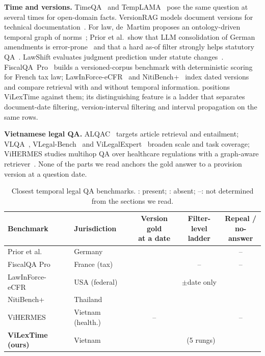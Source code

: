 \documentclass[sigconf,anonymous,review]{acmart}
\newcommand{\cmark}{\textcolor{cGreen}{\ding{51}}}
\newcommand{\xmark}{\textcolor{cVerm}{\ding{55}}}
\begin{document}
\textbf{Time and versions.} TimeQA~\cite{chen2021timeqa} and TempLAMA~\cite{dhingra2022templama} pose the same question at several times for open-domain facts. VersionRAG models document versions for technical documentation~\cite{huwiler2025versionrag}. For law, de~Martim proposes an ontology-driven temporal graph of norms~\cite{demartim2025satgraph}; Prior et al.\ show that LLM consolidation of German amendments is error-prone~\cite{prior2025consolidation} and that a hard as-of filter strongly helps statutory QA~\cite{prior2026oldfriend}. LawShift evaluates judgment prediction under statute changes~\cite{han2025lawshift}. FiscalQA~Pro~\cite{cymbler2026fiscalqa} builds a versioned-corpus benchmark with deterministic scoring for French tax law; LawInForce-eCFR~\cite{yao2026lawinforce} and NitiBench+~\cite{akarajaradwong2026nitibenchplus} index dated versions and compare retrieval with and without temporal information.  positions ViLexTime against them; its distinguishing feature is a ladder that separates document-date filtering, version-interval filtering and interval propagation on the same rows.

\textbf{Vietnamese legal QA.} ALQAC~\cite{thanh2021alqac} targets article retrieval and entailment; VLQA~\cite{nguyen2025vlqa}, VLegal-Bench~\cite{dong2026vietlegal} and ViLegalExpert~\cite{nguyen2026vilegalexpert} broaden scale and task coverage; ViHERMES studies multihop QA over healthcare regulations with a graph-aware retriever~\cite{nguyen2026vihermes}. None of the parts we read anchors the gold answer to a provision version at a question date.

\begin{table}[t]
\centering
\caption{Closest temporal legal QA benchmarks. \cmark: present; \xmark: absent; --: not determined from the sections we read.}
\label{tab:related}
\setlength{\tabcolsep}{2.4pt}
\scriptsize
\begin{tabular}{@{}l l c c c@{}}
\toprule
Benchmark & Jurisdiction & \makecell{Version gold\\at a date} & \makecell{Filter-level\\ladder} & \makecell{Repeal /\\no-answer} \\
\midrule
Prior et al.~\cite{prior2026oldfriend} & Germany & \cmark & \xmark & -- \\
FiscalQA Pro~\cite{cymbler2026fiscalqa} & France (tax) & \cmark & -- & -- \\
LawInForce-eCFR~\cite{yao2026lawinforce} & USA (federal) & \cmark & $\pm$date only & \xmark \\
NitiBench+~\cite{akarajaradwong2026nitibenchplus} & Thailand & \cmark & \xmark & \cmark \\
ViHERMES~\cite{nguyen2026vihermes} & Vietnam (health.) & -- & \xmark & -- \\
\midrule
\textbf{ViLexTime (ours)} & Vietnam & \cmark & \cmark\ (5 rungs) & \cmark \\
\bottomrule
\end{tabular}
\end{table}
\end{document}
